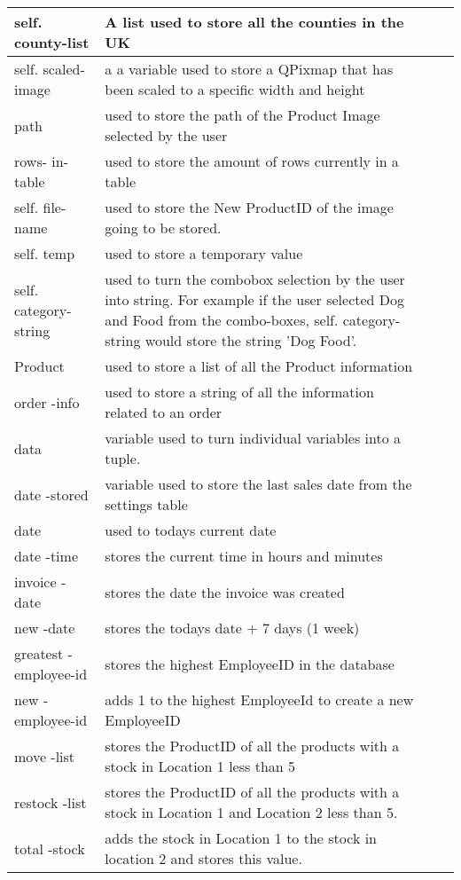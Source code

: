 \begin{center}
\begin{tabular}{|p{1.5cm}|p{4.5cm}|p{1.5cm}|p{3cm}|}
	self. county-list & A list used to  store all the counties in the UK & & \\ \hline
	self. scaled-image & a a variable used to store a QPixmap that has been scaled to a specific width and height & & \\ \hline
	path & used to store the path of the Product Image selected by the user & & \\ \hline
	rows- in-table & used to store the amount of rows currently in a table & & \\ \hline
	self. file-name & used to store the New ProductID of the image going to be stored. & & \\ \hline
	self. temp & used to store a temporary value & & \\ \hline
	self. category-string & used to turn the combobox selection by the user into string. For example if the user selected Dog and Food from the combo-boxes, self. category-string would store the string 'Dog Food'.& & \\ \hline
	Product & used to store a list of all the Product information & & \\ \hline
	order -info & used to store a string of all the information related to an order & & \\ \hline
	data & variable used to turn individual variables into a tuple. & & \\ \hline
	date -stored & variable used to store the last sales date from the settings table & & \\ \hline
	date & used to  todays current date & & \\ \hline
	date -time & stores the current time in hours and minutes & & \\ \hline
	invoice -date & stores the date the invoice was created & & \\ \hline
	new -date & stores the todays date + 7 days (1 week) & & \\ \hline
	greatest -employee-id & stores the highest EmployeeID in the database & & \\ \hline
	new -employee-id & adds 1 to the highest EmployeeId to create a new EmployeeID & & \\ \hline
	move -list & stores the ProductID of all the products with a stock in Location 1 less than 5 & & \\ \hline
	restock -list & stores the ProductID of all the products with a stock in Location 1 and Location 2 less than 5. & & \\ \hline
	total -stock & adds the stock in Location 1 to the stock in location 2 and stores this value. & & \\ \hline

\end{tabular}
\end{center}
